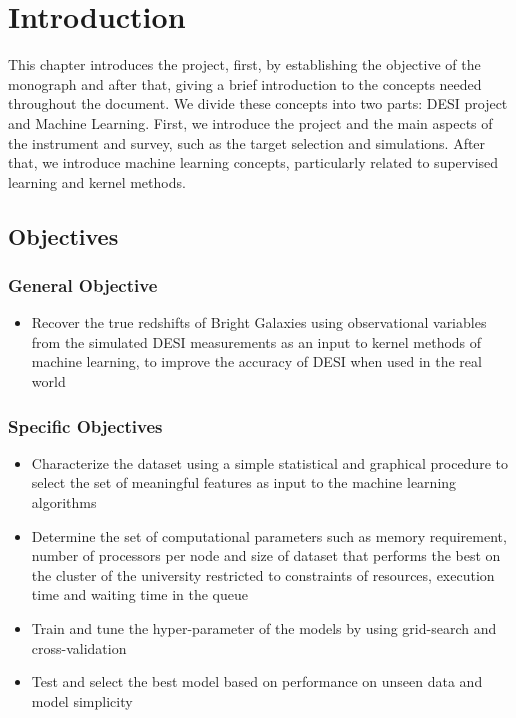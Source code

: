 \chapter{Introduction}
\label{Ch:intro}
This chapter introduces the project, first, by establishing the objective of the monograph and after that, giving a brief introduction to the concepts needed throughout the document. We divide these concepts into two parts: DESI project and Machine Learning. First, we introduce the project and the main aspects of the instrument and survey, such as the target selection and simulations. After that, we introduce machine learning concepts, particularly related to supervised learning and kernel methods.

\section{Objectives}
\subsection{General Objective}
\begin{itemize}
	\item Recover the true redshifts of Bright Galaxies using observational variables from the simulated DESI measurements as an input to kernel methods of machine learning, to improve the accuracy of DESI when used in the real world
\end{itemize}
\subsection{Specific Objectives}
\begin{itemize}
\item Characterize the dataset using a simple statistical and graphical procedure to select the set of meaningful features as input to the machine learning algorithms
\item Determine the set of computational parameters such as memory requirement, number of processors per node and size of dataset that performs the best on the cluster of the university restricted to constraints of resources, execution time and waiting time in the queue
\item Train and tune the hyper-parameter of the models by using grid-search and cross-validation
\item Test and select the best model based on performance on unseen data and model simplicity
\end{itemize}
